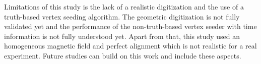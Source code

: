 Limitations of this study is the lack of a realistic digitization and the use of a truth-based vertex seeding algorithm. The geometric digitization is not fully validated yet and the performance of the non-truth-based vertex seeder with time information is not fully understood yet. Apart from that, this study used an homogeneous magnetic field and perfect alignment which is not realistic for a real experiment. Future studies can build on this work and include these aspects.
